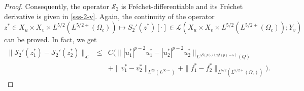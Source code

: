 \documentclass[10pt,a4paper]{amsart}
\begin{document}
\begin{proof}

Consequently, the operator $\mathcal{S}_2$ is Fr\'echet-differentiable and its Fr\'echet derivative is given in 
\eqref{sss-2-v}. Again, the continuity of the operator 
$$z^*\in X_u\times X_v\times L^{5/2}(L^{5/2+}(\Omega_c)) \longmapsto S_2'(z^*)[\cdot]\in  \mathcal{L}(X_u\times X_v\times L^{5/2}(L^{5/2+}(\Omega_c)); Y_v)
$$
 can be proved. In fact, we get 
\begin{eqnarray*}
\| \mathcal{S}_2'(z_1^*) - \mathcal{S}_2'(z_2^*)\|_{\mathcal{L}} %
 &\le& C( \| |u_1^*|^{p-2}u_1^*-|u_2^*|^{p-2}u_2^* \|_{L ^{5\beta(p)/(2\beta(p)-5)}(Q)} \\
 &&+ \| v_1^*-v_2^* \|_{L^{\infty}(L^{\infty-})} + \| f_1^*-f_2^* \|_{L^{5/2}(L^{5/2+}(\Omega_c))}).
\end{eqnarray*}
%
\end{proof}
\end{document}
